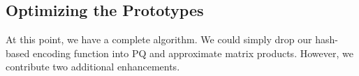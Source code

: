

\subsection{Optimizing the Prototypes}

At this point, we have a complete algorithm. We could simply drop our hash-based encoding function into PQ and approximate matrix products. However, we contribute two additional enhancements.

